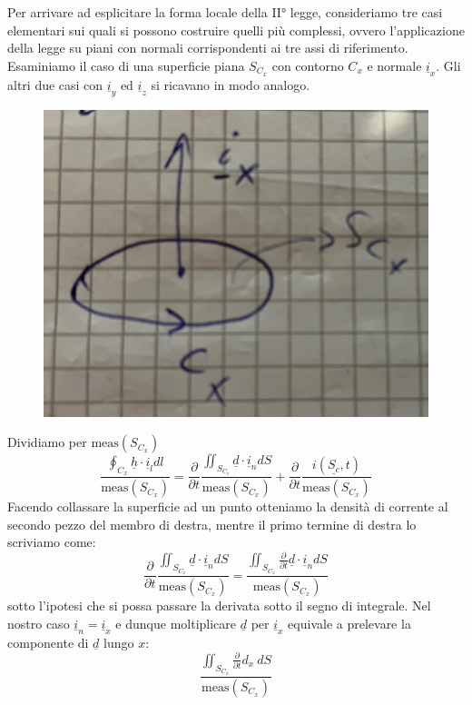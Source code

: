 \documentclass{book}
\begin{document}
        Per arrivare ad esplicitare la forma locale della II° legge, consideriamo tre casi elementari sui quali si possono costruire quelli più complessi, ovvero l'applicazione della legge su piani con normali corrispondenti ai tre assi di riferimento. Esaminiamo il caso di una superficie piana $S_{C_{x}}$ con contorno $C_{x}$ e normale $\underline{i}_{x}$. Gli altri due casi con $\underline{i}_{y}$ ed $\underline{i}_{z}$ si ricavano in modo analogo. 
        \begin{figure}[h!]
            \centering
            \includegraphics[width=0.35\linewidth]{img//Chapter_one/Chapt1img4age.png}
            \caption{}
        \end{figure}
        Dividiamo per $\textrm{meas}(S_{C_{x}})$
        \begin{equation}
            \frac{\displaystyle \oint_{C_{x}} \underline{h} \cdot \underline{i}_{l}dl}{\textrm{meas}(S_{C_{x}})} = \frac{\partial}{\partial t} \frac{\displaystyle \iint_{S_{C_{c}}} \underline{d} \cdot \underline{i}_{n}dS}{\textrm{meas}(S_{C_{x}})} + \frac{\partial}{\partial t} \frac{i(\underline{S_{c}}, t)}{\textrm{meas}(S_{C_{x}})}
        \end{equation}
        Facendo collassare la superficie ad un punto otteniamo la densità di corrente al secondo pezzo del membro di destra, mentre il primo termine di destra lo scriviamo come:
        \begin{equation}
            \frac{\partial}{\partial t} \frac{\displaystyle \iint_{S_{C_{x}}} \underline{d} \cdot \underline{i}_{n} dS}{\textrm{meas}(S_{C_{x}})} = \frac{\displaystyle  \iint_{S_{C_{x}}} \frac{\partial}{\partial t} \underline{d} \cdot \underline{i}_{n} dS}{\textrm{meas}(S_{C_{x}})}  
        \end{equation}
        sotto l'ipotesi che si possa passare la derivata sotto il segno di integrale. Nel nostro caso $\underline{i}_{n} = \underline{i}_{x}$ e dunque moltiplicare $\underline{d}$ per $\underline{i}_{x}$ equivale a prelevare la componente di $\underline{d}$ lungo $x$:
        \begin{equation}
            \frac{\displaystyle  \iint_{S_{C_{x}}} \frac{\partial}{\partial t} d_{x} \ dS}{\textrm{meas}(S_{C_{x}})}  
        \end{equation}
\end{document}
